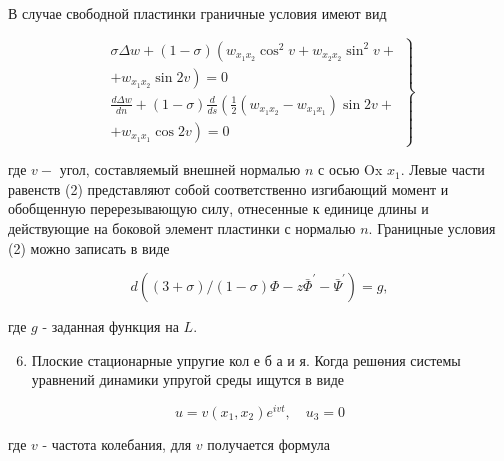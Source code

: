 \documentclass[10pt]{article}
\begin{document}
В случае свободной пластинки граничные условия имеют вид



\[

\left.\begin{array}{c}

\sigma \Delta w+(1-\sigma)\left(w_{x_{1} x_{2}} \cos ^{2} v+w_{x_{2} x_{2}} \sin ^{2} v+\right. \\

\left.+w_{x_{1} x_{2}} \sin 2 v\right)=0 \\

\frac{d \Delta w}{d n}+(1-\sigma) \frac{d}{d s}\left(\frac{1}{2}\left(w_{x_{1} x_{2}}-w_{x_{1} x_{1}}\right) \sin 2 v+\right. \\

\left.+w_{x_{1} x_{1}} \cos 2 v\right)=0

\end{array}\right\}

\]



где $v-$ угол, составляемый внешней нормалью $n$ с осью Ox $x_{1}$. Левые части равенств (2) представляют собой соответственно изгибающий момент и обобщенную перерезывающую силу, отнесенные к единице длины и действующие на боковой элемент пластинки с нормалью $n$. Границные условия (2) можно записать в виде



\[

d\left((3+\sigma) /(1-\sigma) \Phi-z \bar{\Phi}^{\prime}-\bar{\Psi}^{\prime}\right)=g,

\]



где $g$ - заданная функция на $L$.



\begin{enumerate}

  \setcounter{enumi}{5}

  \item Плоские стационарные упругие кол е б а и я. Когда решөния системы уравнений динамики упругой среды ищутся в виде

\end{enumerate}



\[

u=v\left(x_{1}, x_{2}\right) e^{i v t}, \quad u_{3}=0

\]



где $v$ - частота колебания, для $v$ получается формула
\end{document}
